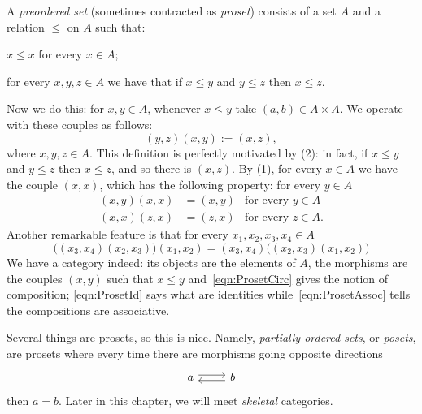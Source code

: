\begin{example}
  A {\em preordered set} (sometimes contracted as {\em proset}) consists
  of a set \(A\) and a relation \(\le\) on \(A\) such that:
  \begin{tcbenum}
  \item \(x \le x\) for every \(x \in A\);
  \item for every \(x, y, z \in A\) we have that if \(x \le y\) and
    \(y \le z\) then \(x \le z\).
  \end{tcbenum}
  Now we do this: for \(x, y \in A\), whenever \(x \le y\) take
  \((a, b) \in A \times A\). We operate with these couples as follows:
  \begin{equation}
    (y, z) (x, y) := (x, z), \label{eqn:ProsetCirc}
  \end{equation}
  where \(x, y, z \in A\). This definition is perfectly motivated by (2):
  in fact, if \(x \le y\) and \(y \le z\) then \(x \le z\), and so there is
  \((x, z)\). By (1), for every \(x \in A\) we have the couple
  \((x, x)\), which has the following property: for every \(y \in A\)
  \begin{equation}
    \begin{aligned}
      (x, y) (x, x) &= (x, y) & \text{for every } y \in A \\
      (x, x) (z, x) &= (z, x) & \text{for every } z \in A .
    \end{aligned}\label{eqn:ProsetId}
  \end{equation}
  Another remarkable feature is that for every
  \(x_1, x_2, x_3, x_4 \in A\)
  \begin{equation}
    \big((x_3, x_4)(x_2, x_3)\big)(x_1, x_2) = (x_3, x_4)\big((x_2,
    x_3)(x_1, x_2)\big)
    \label{eqn:ProsetAssoc}
  \end{equation}
  We have a category indeed: its objects are the elements of \(A\), the
  morphisms are the couples \((x, y)\) such that \(x \le y\)
  and~\eqref{eqn:ProsetCirc} gives the notion of composition;
  \eqref{eqn:ProsetId} says what are identities
  while~\eqref{eqn:ProsetAssoc} tells the compositions are associative.
\end{example}

Several things are prosets, so this is nice. Namely, {\em partially
  ordered sets}, or {\em posets}, are prosets where every time there are
morphisms going opposite directions
\[\begin{tikzcd}
    a \ar[r, shift left] & b \ar[l, shift left]
  \end{tikzcd}\] then \(a = b\). Later in this chapter, we will meet
{\em skeletal} categories.

